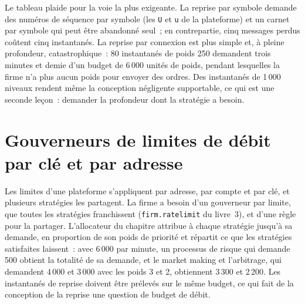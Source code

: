 Le tableau plaide pour la voie la plus exigeante. La reprise par symbole demande des numéros de séquence par symbole (les \texttt{U} et \texttt{u} de la plateforme) et un
carnet par symbole qui peut être abandonné seul~; en contrepartie, cinq messages perdus coûtent cinq instantanés. La reprise par connexion est plus simple et, à pleine
profondeur, catastrophique~: 80 instantanés de poids 250 demandent trois minutes et demie d'un budget de 6\,000 unités de poids, pendant lesquelles la firme n'a plus aucun poids pour
envoyer des ordres. Des instantanés de 1\,000 niveaux rendent même la conception négligente supportable, ce qui est une seconde leçon~: demander la profondeur dont la stratégie a besoin.

\section{Gouverneurs de limites de débit par clé et par adresse}

Les limites d'une plateforme s'appliquent par adresse, par compte et par clé, et plusieurs stratégies les partagent. La firme a besoin d'un gouverneur par limite, que
toutes les stratégies franchissent (\texttt{firm.ratelimit} du livre~3), et d'une règle pour la partager. L'allocateur du chapitre attribue à chaque stratégie jusqu'à sa demande, en
proportion de son poids de priorité et répartit ce que les stratégies satisfaites laissent~: avec 6\,000 par minute, un processus de risque qui demande 500 obtient la totalité de sa demande, et
le market making et l'arbitrage, qui demandent 4\,000 et 3\,000 avec les poids 3 et 2, obtiennent 3\,300 et 2\,200. Les instantanés de reprise doivent être prélevés sur le même
budget, ce qui fait de la conception de la reprise une question de budget de débit.

\begin{omfigure}

\label{fig:nw:api-engineering-for-crypto-venues:budget}
\end{omfigure}

